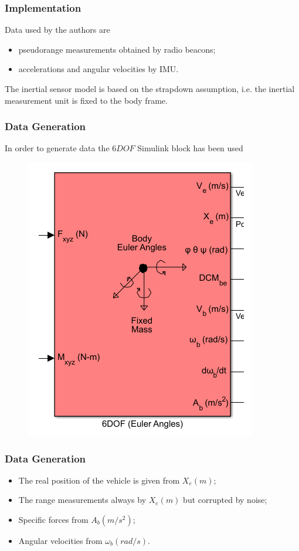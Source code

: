 \documentclass{beamer}
\begin{document}
	\begin{frame}
		\frametitle{Implementation}
		Data used by the authors are \\
		\begin{itemize}
			\item pseudorange measurements obtained by radio beacons;
			\item accelerations and angular velocities by IMU. 
		\end{itemize}
		\vspace{0.5cm}
		The inertial sensor model is based on the strapdown assumption, i.e. the inertial measurement unit is fixed to the body frame.
	\end{frame}
	
	\begin{frame}
		\frametitle{Data Generation}
		In order to generate data the $6DOF$ Simulink block has been used
		\begin{figure}[H]
			\includegraphics[scale=0.4]{6DOF}
		\end{figure}
	\end{frame}
	
	\begin{frame}
		\frametitle{Data Generation}
		\begin{itemize}
			\item The real position of the vehicle is given from $X_e(m)$;
			\item The range measurements always by $X_e(m)$ but corrupted by noise;
			\item Specific forces from $A_b(m/s^2)$;
			\item Angular velocities from $\omega_b(rad/s)$.
		\end{itemize}
	\end{frame}
\end{document}
